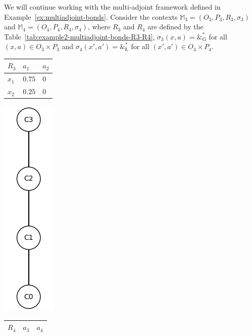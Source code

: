 \documentclass[runningheads,a4paper]{llncs}
\newcommand{\M}{\mathbb{M}}
\newcommand{\adjoint}{\mathop{\&}\nolimits}
\newcommand{\G}{\text{G}}
\let\oldLcommand\L
\let\L\relax
\def\L{\text{\oldLcommand}}
\begin{document}
\begin{example}\label{ex:multiadjoint-bonds-2}
	
We will continue working with the multi-adjoint framework defined in Example~\ref{ex:multiadjoint-bonds}. Consider the contexts $\M_3 = (O_3, P_3, R_3, \sigma_3)$ and $\M_4 = (O_4, P_4, R_4, \sigma_4)$, where $R_3$ and $R_4$ are defined by the Table~\ref{tab:example2-multiadjoint-bonds-R3-R4}, $\sigma_3(x, a) = \adjoint^*_\G$ for all $(x, a) \in O_3 \times P_3$ and $\sigma_4(x', a') = \adjoint^*_\L$ for all $(x', a') \in O_4 \times P_4$.
\begin{table}[h]
	\centering
	\vspace{-0.5cm}
	\begin{minipage}{0.25\textwidth}
	\begin{tabular}{w{c}{20pt} || w{c}{20pt} | w{c}{20pt}}
		$R_3$ & $a_1$ & $a_2$ \\\hline\hline
		$x_1$ & $0.75$ & $0$ \\\hline
		$x_2$ & $0.25$ & $0$
	\end{tabular}
	\end{minipage}
	\begin{minipage}{0.2\textwidth}
		\includegraphics[scale = 0.3]{im/ex-ma2-R3.png}
	\end{minipage}
	\begin{minipage}{0.25\textwidth}
	\begin{tabular}{w{c}{20pt} || w{c}{20pt} | w{c}{20pt}}
		$R_4$ & $a_3$ & $a_4$ \\\hline\hline

\end{tabular}
\end{minipage}
\end{table}
\end{example}
\end{document}
